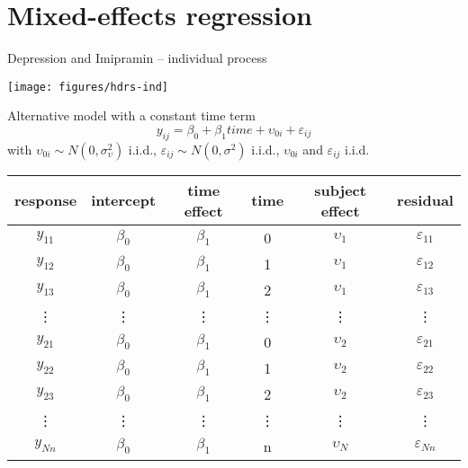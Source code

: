 \documentclass[aspectratio=169]{beamer}
\begin{document}
\section{Mixed-effects regression}

\begin{frame}{Depression and Imipramin -- individual process}
\begin{center}
\texttt{[image: figures/hdrs-ind]}
\end{center}
\end{frame}

\begin{frame}{Alternative model with a constant time term}
  \centering
  \vspace{-1cm}
  \[
    y_{ij} = \beta_0 + \beta_1 time + \upsilon_{0i} + \varepsilon_{ij}
  \]
with $\upsilon_{0i} \sim N(0, \sigma^2_{\upsilon})$ i.i.d.,
$\varepsilon_{ij} \sim N(0, \sigma^2)$ i.i.d., $\upsilon_{0i}$ and
$\varepsilon_{ij}$ i.i.d.\\[2ex]

  \begin{tabular}{cccccc}
    \hline
    response & intercept & time effect & time & subject effect  & residual \\
    \hline
    $y_{11}$ & $\beta_0$ & $\beta_1$   & 0    & $\upsilon_{1}$ & $\varepsilon_{11}$ \\
    $y_{12}$ & $\beta_0$ & $\beta_1$   & 1    & $\upsilon_{1}$ & $\varepsilon_{12}$ \\
    $y_{13}$ & $\beta_0$ & $\beta_1$   & 2    & $\upsilon_{1}$ & $\varepsilon_{13}$ \\
    \vdots & \vdots & \vdots   & \vdots & \vdots & \vdots \\
    $y_{21}$ & $\beta_0$ & $\beta_1$   & 0    & $\upsilon_{2}$ & $\varepsilon_{21}$ \\
    $y_{22}$ & $\beta_0$ & $\beta_1$   & 1    & $\upsilon_{2}$ & $\varepsilon_{22}$ \\
    $y_{23}$ & $\beta_0$ & $\beta_1$   & 2    & $\upsilon_{2}$ & $\varepsilon_{23}$ \\
    \vdots & \vdots & \vdots   & \vdots & \vdots & \vdots \\
    $y_{Nn}$ & $\beta_0$ & $\beta_1$   & n    & $\upsilon_{N}$ & $\varepsilon_{Nn}$ \\
    \hline
  \end{tabular}
\end{frame}
\end{document}
